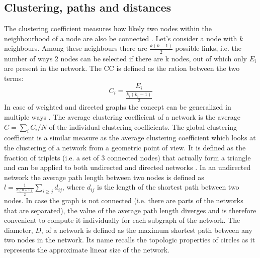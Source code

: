 \subsection{Clustering, paths and distances}
The clustering coefficient measures how likely two nodes within the neighbourhood of a node are also
 be connected \cite{Watts1998}. Let's consider a node with $k$ neighbours. Among these neighbours there are $\frac{k(k-1)}{2}$ possible links, i.e. the number of ways 2 nodes can be selected if there are k nodes,
 out of which only $E_{i}$ are present in the network. The CC is defined as the ration between the two terms:
\begin{equation}
 C_{i} = \frac{E_{i}}{\frac{k_{i}(k_{i} -1)}{2}}
\end{equation}
In case of weighted and directed graphs the concept can be generalized 
in multiple ways \cite{Fagiolo2007}. The average clustering coefficient of a network is the average $C = \sum_{i} C_{i}/ N$ of the individual clustering coefficients.
 The global clustering coefficient is a similar measure as the average clustering coefficient which looks 
at the clustering of a network from a geometric point of view. It is defined as the fraction of triplets (i.e. a set of 3 connected nodes) that actually form a triangle and can be applied to both undirected and directed networks \cite{Newman2003Complex}.
In an undirected network the average path length between two nodes is defined as $l = \frac{1}{\frac{n(n+1)}{2}} \sum_{i\geq j} d_{ij}$,
where $d_{ij}$ is the length of the shortest path between two nodes. In case the graph is not connected (i.e. there are parts of the networks that are separated), the value of the average path length diverges and is therefore
convenient to compute it individually for each subgraph of the network. The diameter, $D$, of a network is defined as the maximum shortest path between any two nodes in the network. Its name recalls the topologic
properties of circles as it represents the approximate linear size of the network.  

